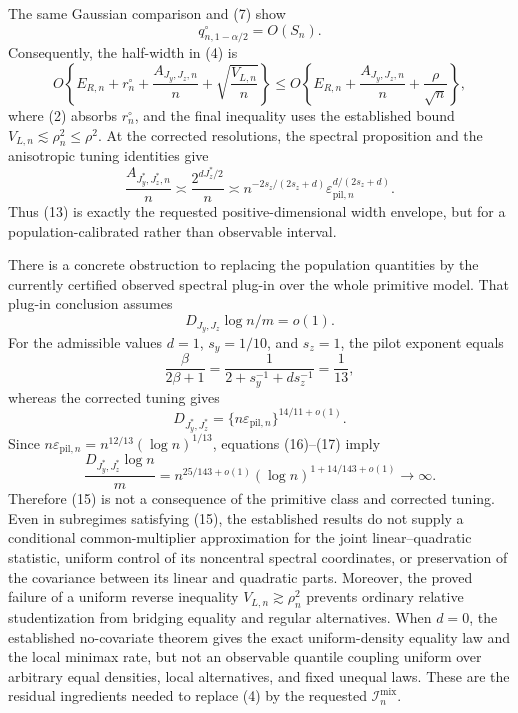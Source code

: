 The same Gaussian comparison and (7) show
\[
q_{n,1-\alpha/2}^\circ=O(S_n).                                \tag{12}
\]
Consequently, the half-width in (4) is
\[
O\!\left\{
E_{R,n}+r_n^\circ+\frac{A_{J_y,J_z,n}}n
+\sqrt{\frac{V_{L,n}}n}
\right\}
\le
O\!\left\{
E_{R,n}+\frac{A_{J_y,J_z,n}}n+\frac{\rho}{\sqrt n}
\right\},                                                     \tag{13}
\]
where (2) absorbs \(r_n^\circ\), and the final inequality uses the established bound \(V_{L,n}\lesssim\rho_n^2\le\rho^2\).  At the corrected resolutions, the spectral proposition and the anisotropic tuning identities give
\[
\frac{A_{J_y^*,J_z^*,n}}n
\asymp\frac{2^{dJ_z^*/2}}n
\asymp n^{-2s_z/(2s_z+d)}
\varepsilon_{\mathrm{pil},n}^{d/(2s_z+d)}.                    \tag{14}
\]
Thus (13) is exactly the requested positive-dimensional width envelope, but for a population-calibrated rather than observable interval.

There is a concrete obstruction to replacing the population quantities by the currently certified observed spectral plug-in over the whole primitive model.  That plug-in conclusion assumes
\[
D_{J_y,J_z}\log n/m=o(1).                                     \tag{15}
\]
For the admissible values \(d=1\), \(s_y=1/10\), and \(s_z=1\), the pilot exponent equals
\[
\frac{\beta}{2\beta+1}
=\frac1{2+s_y^{-1}+ds_z^{-1}}=\frac1{13},                    \tag{16}
\]
whereas the corrected tuning gives
\[
D_{J_y^*,J_z^*}
=\{n\varepsilon_{\mathrm{pil},n}\}^{14/11+o(1)}.             \tag{17}
\]
Since \(n\varepsilon_{\mathrm{pil},n}
=n^{12/13}(\log n)^{1/13}\), equations (16)--(17) imply
\[
\frac{D_{J_y^*,J_z^*}\log n}{m}
=n^{25/143+o(1)}(\log n)^{1+14/143+o(1)}\longrightarrow\infty. \tag{18}
\]
Therefore (15) is not a consequence of the primitive class and corrected tuning.  Even in subregimes satisfying (15), the established results do not supply a conditional common-multiplier approximation for the joint linear--quadratic statistic, uniform control of its noncentral spectral coordinates, or preservation of the covariance between its linear and quadratic parts.  Moreover, the proved failure of a uniform reverse inequality \(V_{L,n}\gtrsim\rho_n^2\) prevents ordinary relative studentization from bridging equality and regular alternatives.  When \(d=0\), the established no-covariate theorem gives the exact uniform-density equality law and the local minimax rate, but not an observable quantile coupling uniform over arbitrary equal densities, local alternatives, and fixed unequal laws.  These are the residual ingredients needed to replace (4) by the requested \(\mathcal I_n^{\mathrm{mix}}\).